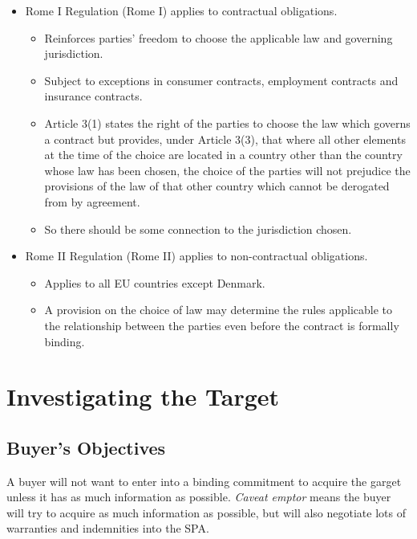 \documentclass[
]{article}
\providecommand{\tightlist}{%
  \setlength{\itemsep}{0pt}\setlength{\parskip}{0pt}}
\begin{document}
\begin{itemize}
\tightlist
\item
  Rome I Regulation (Rome I) applies to contractual obligations.

  \begin{itemize}
  \tightlist
  \item
    Reinforces parties' freedom to choose the applicable law and
    governing jurisdiction.
  \item
    Subject to exceptions in consumer contracts, employment contracts
    and insurance contracts.
  \item
    Article 3(1) states the right of the parties to choose the law which
    governs a contract but provides, under Article 3(3), that where all
    other elements at the time of the choice are located in a country
    other than the country whose law has been chosen, the choice of the
    parties will not prejudice the provisions of the law of that other
    country which cannot be derogated from by agreement.
  \item
    So there should be some connection to the jurisdiction chosen.
  \end{itemize}
\item
  Rome II Regulation (Rome II) applies to non-contractual obligations.

  \begin{itemize}
  \tightlist
  \item
    Applies to all EU countries except Denmark.
  \item
    A provision on the choice of law may determine the rules applicable
    to the relationship between the parties even before the contract is
    formally binding.
  \end{itemize}
\end{itemize}

\hypertarget{investigating-the-target}{%
\section{Investigating the Target}\label{investigating-the-target}}

\hypertarget{buyers-objectives}{%
\subsection{Buyer's Objectives}\label{buyers-objectives}}

A buyer will not want to enter into a binding commitment to acquire the
garget unless it has as much information as possible. \emph{Caveat
emptor} means the buyer will try to acquire as much information as
possible, but will also negotiate lots of warranties and indemnities
into the SPA.
\end{document}

